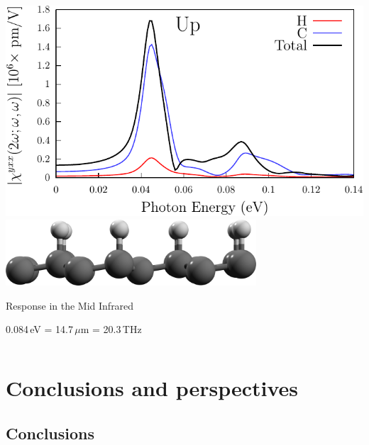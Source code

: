 \documentclass{beamer}
\begin{document}
\begin{frame}
\begin{columns}
\begin{center}
\vspace{-1mm}
\includegraphics[width=1.0\textwidth]{figs/plots/shg-lay-up.pdf}
\vspace{6mm}
\includegraphics[width=0.7\textwidth]{figs/up2.png}

\vspace{7mm}
Response in the Mid Infrared

0.084\,eV = 14.7\,$\mu$m = 20.3\,THz

\end{center}


\end{columns}

\end{frame}


\section{Conclusions and perspectives} 



\subsection{Conclusions}

\end{document}
